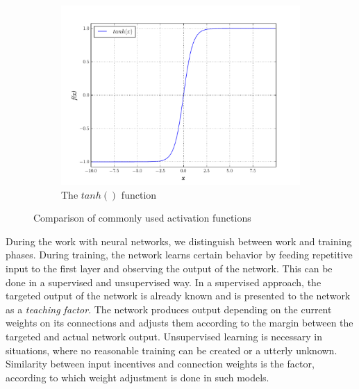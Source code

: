 \documentclass[10pt,a4paper,DIV=11]{scrreprt}
\begin{document}
\begin{figure}[H]
\begin{subfigure}{.5\textwidth}
  \centering
  \includegraphics[width=\linewidth]{files/activation/tanh.pdf}
  \caption{The $tanh()$ function}
  \label{fig:plot3}
\end{subfigure}
\caption{Comparison of commonly used activation functions}
\label{fig:activations}
\end{figure}

During the work with neural networks, we distinguish between work and training phases. During training, the network learns certain behavior by 
feeding repetitive input to the first layer and observing the output of the network. This can be done in a supervised and unsupervised way. In a 
supervised approach, the targeted output of the network is already known and is presented to the network as a \textit{teaching factor}. The 
network produces output depending on the current weights on its connections and adjusts them according to the margin between the targeted and 
actual network output. Unsupervised learning is necessary in situations, where no reasonable training can be created or a utterly unknown.
Similarity between input incentives and connection weights is the factor, according to which weight adjustment is done in such models.
\end{document}

